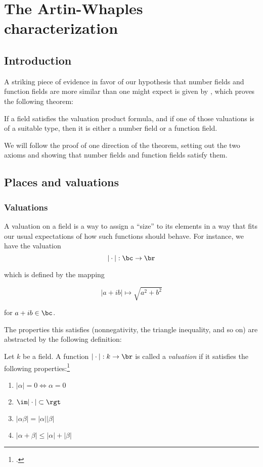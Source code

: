 \chapter{The Artin-Whaples characterization}
\section{Introduction}
\label{sec:orgheadline1}

A striking piece of evidence in favor of our hypothesis that number fields and
function fields are more similar than one might expect is given by
\cite{artinwhaples}, which proves the following theorem:

\begin{thm}
  \label{thm:maintheorem}
  If a field satisfies the valuation product formula, and if one of those
  valuations is of a suitable type, then it is either a number field or a
  function field.
\end{thm}

We will follow the proof of one direction of the theorem, setting out the two
axioms and showing that number fields and function fields satisfy them.

\section{Places and valuations}
\label{sec:orgheadline6}

\subsection{Valuations}
\label{sec:valuations}

A valuation on a field is a way to assign a ``size'' to its elements in a way
that fits our usual expectations of how such functions should behave. For
instance, we have the valuation
\[ |\cdot| : \bc \to \br \]

which is defined by the mapping

\[ |a + ib| \mapsto \sqrt{a^2 + b^2} \]

for $a+ib\in\bc$.

The properties this satisfies (nonnegativity, the triangle inequality, and so
on) are abstracted by the following definition:

\begin{defn}
  Let $k$ be a field. A function $|\cdot|: k\to\br$ is called a
  \textit{valuation} if it satisfies the following properties:\footcite[section
  1]{artinwhaples}
  \begin{enumerate}
  \item $|\alpha| = 0 \iff \alpha = 0$
  \item $\im |\cdot|\subset \rgt$
  \item $|\alpha\beta| = |\alpha||\beta|$
  \item $|\alpha + \beta| \leq |\alpha| + |\beta|$
  \end{enumerate}
\end{defn}

